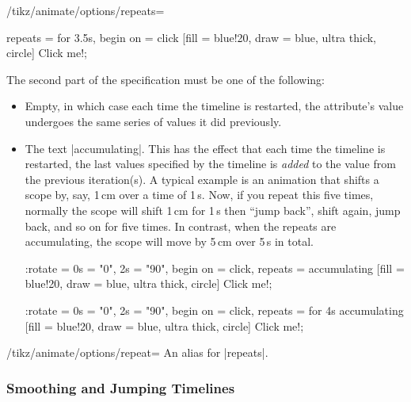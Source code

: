 \begin{key}{/tikz/animate/options/repeats=}
\begin{itemize}
\begin{codeexample}[
    preamble={\usetikzlibrary{animations}},
    animation list={1,2,3,4,5},
]
{                        repeats = for 3.5s, begin on = click }
    [fill = blue!20, draw = blue, ultra thick, circle] {Click me!};
\end{codeexample}
    \end{itemize}
    The second part of the specification must be one of the following:
    \begin{itemize}
        \item Empty, in which case each time the timeline is restarted, the
            attribute's value undergoes the same series of values it did
            previously.
        \item The text |accumulating|. This has the effect that each time the
            timeline is restarted, the last values specified by the timeline is
            \emph{added} to the value from the previous iteration(s). A typical
            example is an animation that shifts a scope by, say, 1\,cm over a
            time of 1\,s. Now, if you repeat this five times, normally the
            scope will shift 1\,cm for 1\,s then ``jump back'', shift again,
            jump back, and so on for five times. In contrast, when the repeats
            are accumulating, the scope will move by 5\,cm over 5\,s in total.
\begin{codeexample}[
    preamble={\usetikzlibrary{animations}},
    animation list={1,2,3,4,5},
]
\tikz \node :rotate = { 0s = "0", 2s = "90", begin on = click,
                        repeats = accumulating }
    [fill = blue!20, draw = blue, ultra thick, circle] {Click me!};
\end{codeexample}
\begin{codeexample}[
    preamble={\usetikzlibrary{animations}},
    animation list={1,2,3,4,5},
]
\tikz \node :rotate = { 0s = "0", 2s = "90", begin on = click,
                        repeats = for 4s accumulating }
    [fill = blue!20, draw = blue, ultra thick, circle] {Click me!};
\end{codeexample}
    \end{itemize}
\end{key}

\begin{key}{/tikz/animate/options/repeat=}
    An alias for |repeats|.
\end{key}


\subsubsection{Smoothing and Jumping Timelines}
\label{section-anim-smooth}

